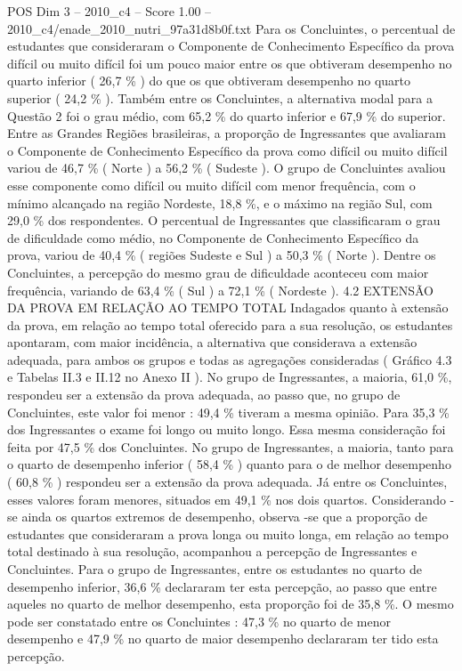 \begin{textsample}{POS Dim 3 – 2010\_c4 – Score 1.00 – 2010\_c4/enade\_2010\_nutri\_97a31d8b0f.txt}
Para os Concluintes, o percentual de estudantes que consideraram o Componente de Conhecimento Específico da prova difícil ou muito difícil foi um pouco maior entre os que obtiveram desempenho no quarto inferior ( 26,7 \% ) do que os que obtiveram desempenho no quarto superior ( 24,2 \% ).
Também entre os Concluintes, a alternativa modal para a Questão 2 foi o grau médio, com 65,2 \% do quarto inferior e 67,9 \% do superior.
Entre as Grandes Regiões brasileiras, a proporção de Ingressantes que avaliaram o Componente de Conhecimento Específico da prova como difícil ou muito difícil variou de 46,7 \% ( Norte ) a 56,2 \% ( Sudeste ).
O grupo de Concluintes avaliou esse componente como difícil ou muito difícil com menor frequência, com o mínimo alcançado na região Nordeste, 18,8 \%, e o máximo na região Sul, com 29,0 \% dos respondentes.
O percentual de Ingressantes que classificaram o grau de dificuldade como médio, no Componente de Conhecimento Específico da prova, variou de 40,4 \% ( regiões Sudeste e Sul ) a 50,3 \% ( Norte ).
Dentre os Concluintes, a percepção do mesmo grau de dificuldade aconteceu com maior frequência, variando de 63,4 \% ( Sul ) a 72,1 \% ( Nordeste ). 4.2 EXTENSÃO DA PROVA EM RELAÇÃO AO TEMPO TOTAL Indagados quanto à extensão da prova, em relação ao tempo total oferecido para a sua resolução, os estudantes apontaram, com maior incidência, a alternativa que considerava a extensão adequada, para ambos os grupos e todas as agregações consideradas ( Gráfico 4.3 e Tabelas II.3 e II.12 no Anexo II ).
No grupo de Ingressantes, a maioria, 61,0 \%, respondeu ser a extensão da prova adequada, ao passo que, no grupo de Concluintes, este valor foi menor : 49,4 \% tiveram a mesma opinião.
Para 35,3 \% dos Ingressantes o exame foi longo ou muito longo.
Essa mesma consideração foi feita por 47,5 \% dos Concluintes.
No grupo de Ingressantes, a maioria, tanto para o quarto de desempenho inferior ( 58,4 \% ) quanto para o de melhor desempenho ( 60,8 \% ) respondeu ser a extensão da prova adequada.
Já entre os Concluintes, esses valores foram menores, situados em 49,1 \% nos dois quartos.
Considerando -se ainda os quartos extremos de desempenho, observa -se que a proporção de estudantes que consideraram a prova longa ou muito longa, em relação ao tempo total destinado à sua resolução, acompanhou a percepção de Ingressantes e Concluintes.
Para o grupo de Ingressantes, entre os estudantes no quarto de desempenho inferior, 36,6 \% declararam ter esta percepção, ao passo que entre aqueles no quarto de melhor desempenho, esta proporção foi de 35,8 \%.
O mesmo pode ser constatado entre os Concluintes : 47,3 \% no quarto de menor desempenho e 47,9 \% no quarto de maior desempenho declararam ter tido esta percepção.

\end{textsample}
